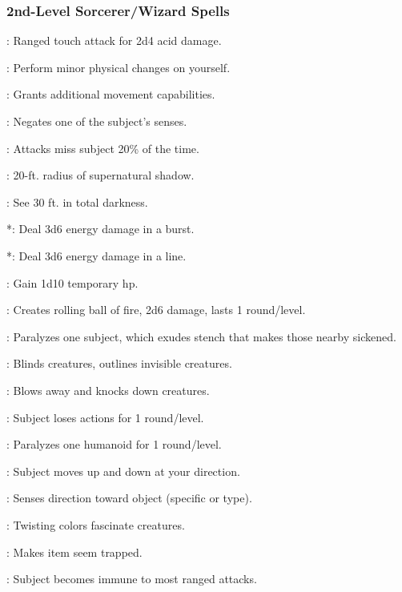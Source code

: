 \subsubsection{2nd-Level Sorcerer/Wizard Spells}
\begin{list}{}{\leftmargin=1em}
\item {}: Ranged touch attack for 2d4 acid damage.
\item {}: Perform minor physical changes on yourself.
\item {}: Grants additional movement capabilities.
\item {}: Negates one of the subject's senses.
\item {}: Attacks miss subject 20\% of the time.
\item {}: 20-ft. radius of supernatural shadow.
\item {}: See 30 ft. in total darkness.
\item {}*: Deal 3d6 energy damage in a burst.
\item {}*: Deal 3d6 energy damage in a line.
\item {}: Gain 1d10 temporary hp.
\item {}: Creates rolling ball of fire, 2d6 damage, lasts 1 round/level.
\item {}: Paralyzes one subject, which exudes stench that makes those nearby sickened.
\item {}: Blinds creatures, outlines invisible creatures.
\item {}: Blows away and knocks down creatures.
\item {}: Subject loses actions for 1 round/level.
\item {}: Paralyzes one humanoid for 1 round/level.
\item {}: Subject moves up and down at your direction.
\item {}: Senses direction toward object (specific or type).
\item {}: Twisting colors fascinate creatures.
\item {}: Makes item seem trapped.
\item {}: Subject becomes immune to most ranged attacks.

\end{list}
